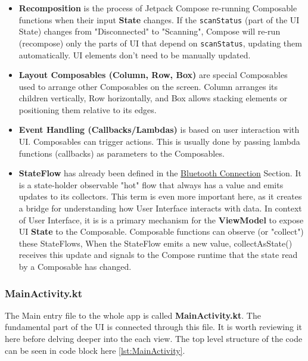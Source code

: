 \begin{itemize}
	\item \textbf{Recomposition} is the process of Jetpack Compose re-running Composable functions when their input \textbf{State} changes. If the \texttt{scanStatus} (part of the \ac{UI} State) changes from "Disconnected" to "Scanning", Compose will re-run (recompose) only the parts of \ac{UI} that depend on \texttt{scanStatus}, updating them automatically. \ac{UI} elements don't need to be manually updated.
	\item \textbf{Layout Composables (Column, Row, Box)} are special Composables used to arrange other Composables on the screen. Column arranges its children vertically, Row horizontally, and Box allows stacking elements or positioning them relative to its edges.
	\item \textbf{Event Handling (Callbacks/Lambdas)} is based on user interaction with \ac{UI}. Composables can trigger actions. This is usually done by passing lambda functions (callbacks) as parameters to the Composables.
	\item \textbf{StateFlow} has already been defined in the \hyperref[subsec:Bluetooth]{Bluetooth Connection} Section. It is a state-holder observable "hot" flow that always has a value and emits updates to its collectors. This term is even more important here, as it creates a bridge for understanding how User Interface interacts with data. In context of User Interface, it is is a primary mechanism for the \textbf{ViewModel} to expose \ac{UI} \textbf{State} to the Composable. Composable functions can observe (or "collect") these StateFlows, When the StateFlow emits a new value, collectAsState() receives this update and signals to the Compose runtime that the state read by a Composable has changed.
\end{itemize}

\subsubsection{MainActivity.kt}
The Main entry file to the whole app is called \textbf{MainActivity.kt}. The fundamental part of the \ac{UI} is connected through this file. It is worth reviewing it here before delving deeper into the each view. The top level structure of the code can be seen in code block here \ref{lst:MainActivity}.

